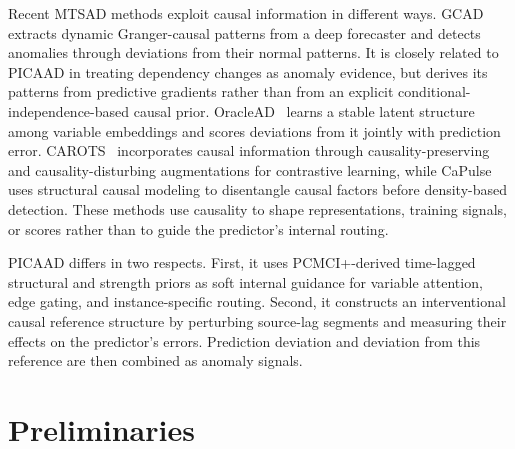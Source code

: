 \documentclass[letterpaper]{article}
\begin{document}
Recent MTSAD methods exploit causal information in different ways. GCAD~\cite{liu2025gcad} extracts dynamic Granger-causal patterns from a deep forecaster and detects anomalies through deviations from their normal patterns. It is closely related to PICAAD in treating dependency changes as anomaly evidence, but derives its patterns from predictive gradients rather than from an explicit conditional-independence-based causal prior. OracleAD~\cite{cho2025oraclead} learns a stable latent structure among variable embeddings and scores deviations from it jointly with prediction error. CAROTS~\cite{kim2025carots} incorporates causal information through causality-preserving and causality-disturbing augmentations for contrastive learning, while CaPulse~\cite{xia2025capulse} uses structural causal modeling to disentangle causal factors before density-based detection. These methods use causality to shape representations, training signals, or scores rather than to guide the predictor's internal routing.

PICAAD differs in two respects. First, it uses PCMCI+-derived time-lagged structural and strength priors as soft internal guidance for variable attention, edge gating, and instance-specific routing. Second, it constructs an interventional causal reference structure by perturbing source-lag segments and measuring their effects on the predictor's errors. Prediction deviation and deviation from this reference are then combined as anomaly signals.

\section{Preliminaries}
\end{document}
